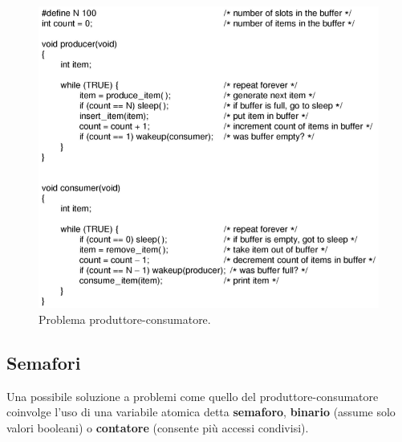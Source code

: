 \documentclass{article}
\begin{document}
\begin{figure}[H]
    \centering
    \includegraphics[scale=0.5]{produttoreconsumatore.png}
    \caption{Problema produttore-consumatore.}
    \label{fig:prod-cons}
\end{figure}

\subsection{Semafori} Una possibile soluzione a problemi come quello del produttore-consumatore coinvolge l'uso di una variabile atomica detta \textbf{semaforo}, \textbf{binario} (assume solo valori booleani) o \textbf{contatore} (consente più accessi condivisi).
\end{document}
